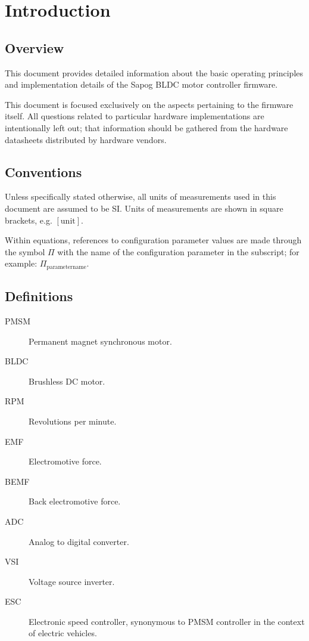 \documentclass{zubaxdoc}
\begin{document}
\begin{titlepage}
\end{titlepage}

\tableofcontents
\clearpage
\listoffigures
\BeginRightColumn
\listoftables

\mainmatter

\chapter{Introduction}

\section{Overview}

This document provides detailed information about the basic operating principles and
implementation details of the Sapog BLDC motor controller firmware.

This document is focused exclusively on the aspects pertaining to the firmware itself.
All questions related to particular hardware implementations are intentionally left out;
that information should be gathered from the hardware datasheets distributed by
hardware vendors.

\section{Conventions}

Unless specifically stated otherwise, all units of measurements used in this document are assumed to be SI.
Units of measurements are shown in square brackets, e.g. $\left[\text{unit}\right]$.

Within equations, references to configuration parameter values are made through the symbol $\Pi$
with the name of the configuration parameter in the subscript;
for example: $\Pi_\text{parametername}$.

\section{Definitions}

\begin{description}
    \item[PMSM] Permanent magnet synchronous motor.
    \item[BLDC] Brushless DC motor.
    \item[RPM] Revolutions per minute.
    \item[EMF] Electromotive force.
    \item[BEMF] Back electromotive force.
    \item[ADC] Analog to digital converter.
    \item[VSI] Voltage source inverter.
    \item[ESC] Electronic speed controller, synonymous to PMSM controller in the context of electric vehicles.
\end{description}
\end{document}
